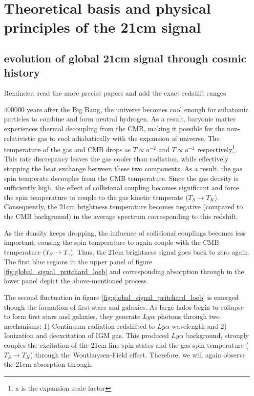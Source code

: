 \documentclass[12pt, TexShade, letterpaper]{report}
\begin{document}
\section{Theoretical basis and physical principles of the 21cm signal}
\subsection{evolution of global 21cm signal through cosmic history}
Reminder: read the more precise papers and add the exact redshift ranges \par
400000 years after the Big Bang, the universe becomes cool enough for subatomic particles to combine and form neutral hydrogen. As a result, baryonic matter experiences thermal decoupling from the CMB, making it possible for the non-relativistic gas to cool adiabatically with the expansion of universe\cite{21century}. The temperature of the gas and CMB drops as $T\propto a^{-2}$ and $T\propto a^{-1}$ respectively\footnote{a is the expansion scale factor}. This rate discrepancy leaves the gas cooler than radiation, while effectively stopping the heat exchange between these two components. As a result, the gas spin temperate decouples from the CMB temperature. Since the gas density is sufficiently high, the effect of collisional coupling becomes significant and force the spin temperature to couple to the gas kinetic temperate ($T_S \rightarrow T_K$). Consequently, the 21cm brightness temperature becomes negative (compared to the CMB background) in the average spectrum corresponding to this redshift\cite{map_universe}.\par
As the density keeps dropping, the influence of collisional couplings becomes less important, causing the spin temperature to again couple with the CMB temperature ($T_S \rightarrow T_\gamma$). Thus, the 21cm brightness signal goes back to zero again\cite{map_universe}. The first blue regions in the upper panel of figure \ref{fig:global_signal_pritchard_loeb} and corresponding absorption through in the lower panel depict the above-mentioned process.\par
The second fluctuation in figure \ref{fig:global_signal_pritchard_loeb} is emerged though the formation of first stars and galaxies. As large halos begin to collapse to form first stars and galaxies, they generate $Ly\alpha$ photons through two mechanisms: 1) Continuum radiation redshifted to $Ly\alpha$ wavelength and 2) Ionization and deexcitation of IGM gas. This produced $Ly\alpha$ background, strongly couples the excitation of the 21cm line spin states and the gas spin temperature ($T_S \rightarrow T_K$) through the Wouthuysen-Field effect. Therefore, we will again observe the 21cm absorption through\cite{map_universe}\cite{21century}.\par
\end{document}
